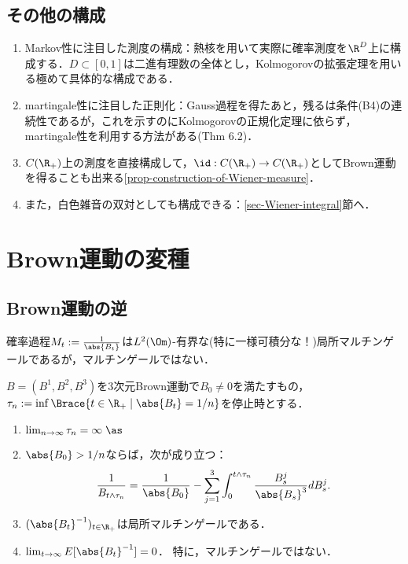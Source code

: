 \documentclass[uplatex,dvipdfmx]{jsreport}
\begin{document}
\subsection{その他の構成}

\begin{tcolorbox}[colframe=ForestGreen, colback=ForestGreen!10!white,breakable,colbacktitle=ForestGreen!40!white,coltitle=black,fonttitle=\bfseries\sffamily,
title=]
    \begin{enumerate}
        \item Markov性に注目した測度の構成：熱核を用いて実際に確率測度を$\R^D$上に構成する．$D\subset[0,1]$は二進有理数の全体とし，Kolmogorovの拡張定理を用いる極めて具体的な構成である\cite{舟木}．
        \item martingale性に注目した正則化：Gauss過程を得たあと，残るは条件(B4)の連続性であるが，これを示すのにKolmogorovの正規化定理に依らず，martingale性を利用する方法がある\cite{Bass}(Thm 6.2)．
        \item $C(\R_+)$上の測度を直接構成して，$\id:C(\R_+)\to C(\R_+)$としてBrown運動を得ることも出来る\ref{prop-construction-of-Wiener-measure}．
        \item また，白色雑音の双対としても構成できる：\ref{sec-Wiener-integral}節へ．
    \end{enumerate}
\end{tcolorbox}

\section{Brown運動の変種}


\subsection{Brown運動の逆}

\begin{tcolorbox}[colframe=ForestGreen, colback=ForestGreen!10!white,breakable,colbacktitle=ForestGreen!40!white,coltitle=black,fonttitle=\bfseries\sffamily,
title=]
    確率過程$M_t:=\frac{1}{\abs{B_t}}$は$L^2(\Om)$-有界な(特に一様可積分な！)局所マルチンゲールであるが，マルチンゲールではない．
\end{tcolorbox}

\begin{lemma}
    $B=(B^1,B^2,B^3)$を3次元Brown運動で$B_0\ne0$を満たすもの，
    $\tau_n:=\inf\Brace{t\in\R_+\mid\abs{B_t}=1/n}$を停止時とする．
    \begin{enumerate}
        \item $\lim_{n\to\infty}\tau_n=\infty\;\as$
        \item $\abs{B_0}>1/n$ならば，次が成り立つ：
        \[\frac{1}{B_{t\land\tau_n}}=\frac{1}{\abs{B_0}}-\sum_{j=1}^3\int^{t\land\tau_n}_0\frac{B^j_s}{\abs{B_s}^3}dB^j_s.\]
        \item $(\abs{B_t}^{-1})_{t\in\R_+}$は局所マルチンゲールである．
        \item $\lim_{t\to\infty}E[\abs{B_t}^{-1}]=0$．
        特に，マルチンゲールではない．
    \end{enumerate}
\end{lemma}
\end{document}
